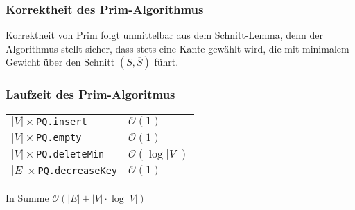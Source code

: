 \subsubsection{Korrektheit des Prim-Algorithmus}
Korrektheit von Prim folgt unmittelbar aus dem Schnitt-Lemma, denn der Algorithmus stellt sicher, dass stets eine Kante gewählt wird, die mit minimalem Gewicht über den Schnitt $(S,\overline{S})$ führt.
\subsubsection{Laufzeit des Prim-Algoritmus}
\begin{tabular}{ll}
	$|V|\times$\texttt{PQ.insert}&$\mathcal{O}(1)$\\
	$|V|\times$\texttt{PQ.empty}&$\mathcal{O}(1)$\\
	$|V|\times$\texttt{PQ.deleteMin}&$\mathcal{O}(\log|V|)$\\
	$|E|\times$\texttt{PQ.decreaseKey}&$\mathcal{O}(1)$
\end{tabular}
In Summe $\mathcal{O}(|E|+|V|\cdot\log|V|)$